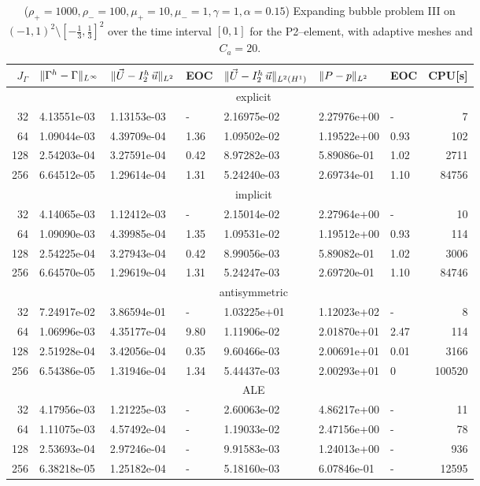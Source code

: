 \begin{table}
\center
\hspace*{-3.25cm}
\begin{tabular}{rllllllr}
\hline
$J_\Gamma$ & $\|\Gamma^h - \Gamma\|_{L^\infty}$ & $\|\vec U - I^h_{2}\,\vec u\|_{L^2}$ & EOC & $\|\vec U - I^h_{2}\,\vec u\|_{L^2(H^1)}$ & $\|P - p\|_{L^2}$ & EOC
& CPU[s] \\
\hline
& \multicolumn{7}{c}{explicit} \\
\hline
 32 & 4.13551e-03 & 1.13153e-03 &    - & 2.16975e-02 & 2.27976e+00 &    - &
7 \\
 64 & 1.09044e-03 & 4.39709e-04 & 1.36 & 1.09502e-02 & 1.19522e+00 & 0.93 &
102 \\
128 & 2.54203e-04 & 3.27591e-04 & 0.42 & 8.97282e-03 & 5.89086e-01 & 1.02 &
2711 \\
256 & 6.64512e-05 & 1.29614e-04 & 1.31 & 5.24240e-03 & 2.69734e-01 & 1.10 &
84756 \\
\hline
& \multicolumn{7}{c}{implicit} \\
\hline
 32 & 4.14065e-03 & 1.12412e-03 &    - & 2.15014e-02 & 2.27964e+00 &    - &
10 \\
 64 & 1.09090e-03 & 4.39985e-04 & 1.35 & 1.09531e-02 & 1.19512e+00 & 0.93 &
114 \\
128 & 2.54225e-04 & 3.27943e-04 & 0.42 & 8.99056e-03 & 5.89082e-01 & 1.02 &
3006 \\
256 & 6.64570e-05 & 1.29619e-04 & 1.31 & 5.24247e-03 & 2.69720e-01 & 1.10 &
84746 \\
\hline
& \multicolumn{7}{c}{antisymmetric} \\
\hline
 32 & 7.24917e-02 & 3.86594e-01 &    - & 1.03225e+01 & 1.12023e+02 &    - &
 8 \\
 64 & 1.06996e-03 & 4.35177e-04 & 9.80 & 1.11906e-02 & 2.01870e+01 & 2.47 &
114 \\
128 & 2.51928e-04 & 3.42056e-04 & 0.35 & 9.60466e-03 & 2.00691e+01 & 0.01 &
3166 \\
256 & 6.54386e-05 & 1.31946e-04 & 1.34 & 5.44437e-03 & 2.00293e+01 &    0 &
100520 \\
\hline
& \multicolumn{7}{c}{ALE} \\
\hline
 32 & 4.17956e-03 & 1.21225e-03 & - & 2.60063e-02 & 4.86217e+00 & - &    11 \\
 64 & 1.11075e-03 & 4.57492e-04 & - & 1.19033e-02 & 2.47156e+00 & - &    78 \\
128 & 2.53693e-04 & 2.97246e-04 & - & 9.91583e-03 & 1.24013e+00 & - &   936 \\
256 & 6.38218e-05 & 1.25182e-04 & - & 5.18160e-03 & 6.07846e-01 & - & 12595 \\
\hline
\end{tabular}
\hspace*{-3.25cm}
\caption[Navier--Stokes expanding bubble III errors P2--\pdg]
{($\rho_+ = 1000,\rho_- = 100,\mu_+ = 10,\mu_- =1,\gamma = 1,\alpha=0.15$)
Expanding bubble problem III on $(-1,1)^2\setminus[-\frac{1}{3},\frac{1}{3}]^2$
over the time interval $[0,1]$ for the P2--\pdg element, with adaptive
meshes and $C_a=20$\textdegree.}
\label{tab:nsexpandingbubbleIIIp2p1dg}
\end{table}

